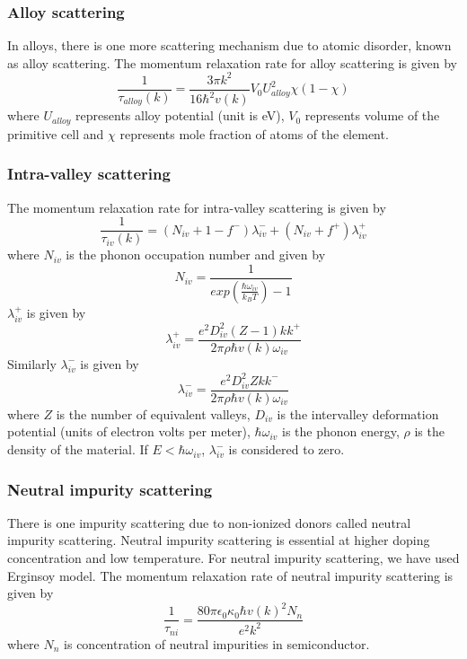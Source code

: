 \documentclass[12pt]{article}
\begin{document}
\subsubsection{Alloy scattering}

In alloys, there is one more scattering mechanism due to atomic disorder, known as alloy scattering. The momentum relaxation rate for alloy scattering is given by \cite{ramu2010rigorous}
\begin{equation}
\frac{1}{\tau_{alloy}(k)} = \frac{3 \pi k^2}{16 \hbar^2 v(k)} V_0 U_{alloy}^2 \chi (1-\chi)
\label{alloy}
\end{equation}
where $U_{alloy}$ represents alloy potential (unit is eV), $V_0$ represents volume of the primitive cell and $\chi$ represents mole fraction of atoms of the element.


\subsubsection{Intra-valley scattering}

The momentum relaxation rate for intra-valley scattering is given by \cite{rode3}
\begin{equation}
\frac{1}{\tau_{iv}(k)} = (N_{iv} + 1 - f^-) \lambda_{iv}^- + (N_{iv} + f^+) \lambda_{iv}^+ 
\label{iv}
\end{equation}
where $N_{iv}$ is the phonon occupation number and given by
\begin{equation}
N_{iv} = \frac{1}{exp(\frac{\hbar \omega_{iv}}{k_B T})-1} 
\label{N_iv}
\end{equation}  
$\lambda_{iv}^+$ is given by
\begin{equation}
\lambda_{iv}^+ = \frac{e^2D_{iv}^2(Z-1)kk^+}{2 \pi \rho \hbar v(k) \omega_{iv}} 
\label{lambda_iv_pos}
\end{equation}  
Similarly $\lambda_{iv}^-$ is given by
\begin{equation}
\lambda_{iv}^- = \frac{e^2D_{iv}^2 Z kk^-}{2 \pi \rho \hbar v(k) \omega_{iv}} 
\label{lambda_iv_neg}
\end{equation}  
where $Z$ is the number of equivalent valleys, $D_{iv}$ is the intervalley deformation potential (units of electron volts per meter), $\hbar \omega_{iv}$ is the phonon energy, $\rho$ is the density of the material. If $E < \hbar \omega_{iv}$,  $\lambda_{iv}^-$ is considered to zero.\\ 


\subsubsection{Neutral impurity scattering}
There is one impurity scattering due to non-ionized donors called neutral impurity scattering. Neutral impurity scattering is essential at higher doping concentration and low temperature. For neutral impurity scattering, we have used Erginsoy model\cite{erginsoy}. The momentum relaxation rate of neutral impurity scattering is given by
\begin{equation}
\frac{1}{\tau_{ni}} = \frac{80 \pi \epsilon_0 \kappa_0 \hbar v(k)^2 N_n}{e^2 k^2}
\label{neutral_impurity}
\end{equation}  
where $N_n$ is concentration of neutral impurities in semiconductor.  
\end{document}
